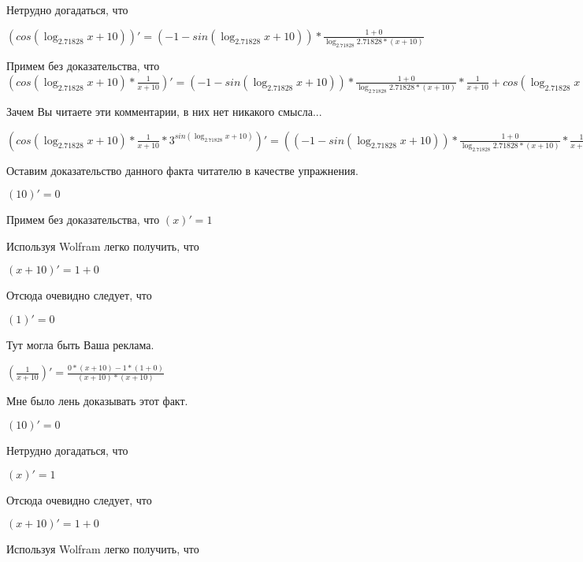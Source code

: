 \documentclass[12pt,a4paper,fleqn]{article}
\theoremstyle{definition}
\begin{document}
Нетрудно догадаться, что

$(cos(\log_{ 2.71828 }{ x  +  10 }))' = ( -1  - sin(\log_{ 2.71828 }{ x  +  10 })) * \frac{ 1  +  0 }{\log_{ 2.71828 }{ 2.71828 } * ( x  +  10 )}
$

Примем без доказательства, что
$(cos(\log_{ 2.71828 }{ x  +  10 }) * \frac{ 1 }{ x  +  10 }
)' = ( -1  - sin(\log_{ 2.71828 }{ x  +  10 })) * \frac{ 1  +  0 }{\log_{ 2.71828 }{ 2.71828 } * ( x  +  10 )}
 * \frac{ 1 }{ x  +  10 }
 + cos(\log_{ 2.71828 }{ x  +  10 }) * \frac{ 0  * ( x  +  10 ) -  1  * ( 1  +  0 )}{( x  +  10 ) * ( x  +  10 )}
$

Зачем Вы читаете эти комментарии, в них нет никакого смысла...

$(cos(\log_{ 2.71828 }{ x  +  10 }) * \frac{ 1 }{ x  +  10 }
 * { 3 }^{sin(\log_{ 2.71828 }{ x  +  10 })})' = (( -1  - sin(\log_{ 2.71828 }{ x  +  10 })) * \frac{ 1  +  0 }{\log_{ 2.71828 }{ 2.71828 } * ( x  +  10 )}
 * \frac{ 1 }{ x  +  10 }
 + cos(\log_{ 2.71828 }{ x  +  10 }) * \frac{ 0  * ( x  +  10 ) -  1  * ( 1  +  0 )}{( x  +  10 ) * ( x  +  10 )}
) * { 3 }^{sin(\log_{ 2.71828 }{ x  +  10 })} + cos(\log_{ 2.71828 }{ x  +  10 }) * \frac{ 1 }{ x  +  10 }
 * \log_{ 2.71828 }{ 3 } * cos(\log_{ 2.71828 }{ x  +  10 }) * \frac{ 1  +  0 }{\log_{ 2.71828 }{ 2.71828 } * ( x  +  10 )}
 * { 3 }^{sin(\log_{ 2.71828 }{ x  +  10 })}$

Оставим доказательство данного факта читателю в качестве упражнения.

$( 10 )' =  0 $

Примем без доказательства, что
$( x )' =  1 $

Используя Wolfram легко получить, что

$( x  +  10 )' =  1  +  0 $

Отсюда очевидно следует, что

$( 1 )' =  0 $

Тут могла быть Ваша реклама.

$(\frac{ 1 }{ x  +  10 }
)' = \frac{ 0  * ( x  +  10 ) -  1  * ( 1  +  0 )}{( x  +  10 ) * ( x  +  10 )}
$

Мне было лень доказывать этот факт.

$( 10 )' =  0 $

Нетрудно догадаться, что

$( x )' =  1 $

Отсюда очевидно следует, что

$( x  +  10 )' =  1  +  0 $

Используя Wolfram легко получить, что
\end{document}
